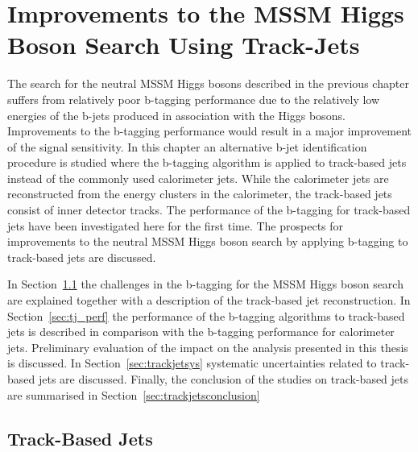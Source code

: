 \chapter{Improvements to the MSSM Higgs Boson Search Using Track-Jets} \label{chap:trackjet}

The search for the neutral MSSM Higgs bosons described in the previous chapter
suffers  from  relatively poor b-tagging performance due to the relatively low energies of
the b-jets produced in association with the Higgs bosons.
Improvements to the b-tagging performance would result in a major improvement of the signal sensitivity. 
In this chapter an alternative b-jet identification procedure is studied where  the b-tagging algorithm is applied to 
track-based jets instead of the commonly used calorimeter jets. While the calorimeter jets are reconstructed
from the energy clusters in the calorimeter, the track-based jets consist of inner detector tracks.
The performance of the b-tagging for track-based jets have been investigated here for the first time.
The prospects for improvements to the neutral MSSM Higgs boson search  by applying b-tagging to track-based jets
are discussed. 

In Section~\ref{sec:tj_intro} the challenges in the b-tagging for  the MSSM Higgs boson search are explained
together with a description of the track-based jet reconstruction. 
In Section~\ref{sec:tj_perf} the performance of the  b-tagging algorithms to track-based jets is described 
in comparison with the b-tagging performance for calorimeter jets. Preliminary evaluation of the impact on the
analysis presented in this thesis is discussed. In Section~\ref{sec:trackjetsys} 
systematic uncertainties related to track-based jets are discussed. Finally, the conclusion of the studies on
track-based jets are summarised in Section~\ref{sec:trackjetsconclusion}


\restoregeometry
\clearpage

\section{Track-Based Jets} \label{sec:tj_intro}

